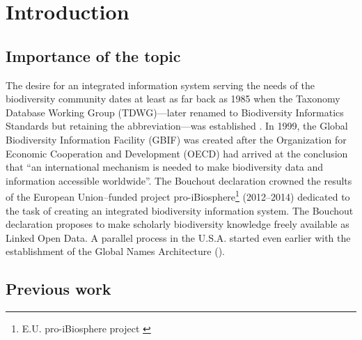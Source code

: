 \chapter{Introduction}
\label{chapter-introduction} 
\newcommand{\keyword}[1]{\textbf{#1}}
\newcommand{\tabhead}[1]{\textbf{#1}}
\newcommand{\code}[1]{\texttt{#1}}
\newcommand{\file}[1]{\texttt{\bfseries#1}}
\newcommand{\option}[1]{\texttt{\itshape#1}}
\section{Importance of the topic}

The desire for an integrated information system serving the needs of the biodiversity community dates at least as far back as 1985 when the Taxonomy Database Working Group (TDWG)---later renamed to Biodiversity Informatics Standards but retaining the abbreviation---was established \cite{noauthor_tdwg_nodate}. In 1999, the Global Biodiversity Information Facility (GBIF) was created \cite{noauthor_what_nodate} after the Organization for Economic Cooperation and Development (OECD) had arrived at the conclusion that ``an international mechanism is needed to make biodiversity data and information accessible worldwide''. The Bouchout declaration \cite{noauthor_bouchout_nodate} crowned the results of the European Union--funded project pro-iBiosphere\footnote{E.U. pro-iBiosphere project \cite{noauthor_pro-ibiosphere_nodate}} (2012--2014) dedicated to the task of creating an integrated biodiversity information system. The Bouchout declaration proposes to make scholarly biodiversity knowledge freely available as Linked Open Data.  A parallel process in the U.S.A. started even earlier with the establishment of the Global Names Architecture (\cite{patterson_names_2010,pyle_towards_2016}).

\section{Previous work}

